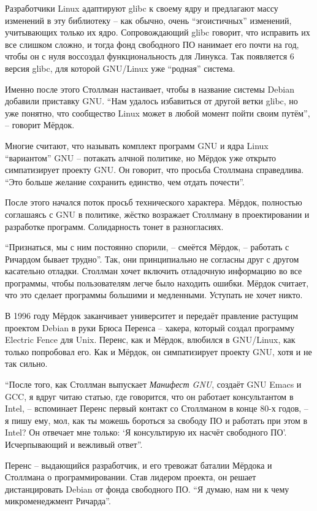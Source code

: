 Разработчики Linux адаптируют glibc к своему ядру и предлагают массу изменений в эту библиотеку -- как обычно, очень \enquote{эгоистичных} изменений, учитывающих только их ядро. Сопровождающий glibc говорит, что исправить их все слишком сложно, и тогда фонд свободного ПО нанимает его почти на год, чтобы он с нуля воссоздал функциональность для Линукса. Так появляется 6 версия glibc, для которой GNU/Linux уже \enquote{родная} система.

Именно после этого Столлман настаивает, чтобы в название системы Debian добавили приставку GNU. \enquote{Нам удалось избавиться от другой ветки glibc, но уже понятно, что сообщество Linux может в любой момент пойти своим путём}, -- говорит Мёрдок.

Многие считают, что называть комплект программ GNU и ядра Linux \enquote{вариантом} GNU -- потакать алчной политике, но Мёрдок уже открыто симпатизирует проекту GNU. Он говорит, что просьба Столлмана справедлива. \enquote{Это больше желание сохранить единство, чем отдать почести}.

После этого начался поток просьб технического характера. Мёрдок, полностью соглашаясь с GNU в политике, жёстко возражает Столлману в проектировании и разработке программ. Солидарность тонет в разногласиях.

\enquote{Признаться, мы с ним постоянно спорили, -- смеётся Мёрдок, -- работать с Ричардом бывает трудно}. Так, они принципиально не согласны друг с другом касательно отладки. Столлман хочет включить отладочную информацию во все программы, чтобы пользователям легче было находить ошибки. Мёрдок считает, что это сделает программы большими и медленными. Уступать не хочет никто.

В 1996 году Мёрдок заканчивает университет и передаёт правление растущим проектом Debian в руки Брюса Перенса -- хакера, который создал программу Electric Fence для Unix. Перенс, как и Мёрдок, влюбился в GNU/Linux, как только попробовал его. Как и Мёрдок, он симпатизирует проекту GNU, хотя и не так сильно.

\enquote{После того, как Столлман выпускает \textit{Манифест GNU}, создаёт GNU Emacs и GCC, я вдруг читаю статью, где говорится, что он работает консультантом в Intel, -- вспоминает Перенс первый контакт со Столлманом в конце 80-х годов, -- я пишу ему, мол, как ты можешь бороться за свободу ПО и работать при этом в Intel? Он отвечает мне только: \enquote{Я консультирую их насчёт свободного ПО}. Исчерпывающий и вежливый ответ}.

Перенс -- выдающийся разработчик, и его тревожат баталии Мёрдока и Столлмана о программировании. Став лидером проекта, он решает дистанцировать Debian от фонда свободного ПО. \enquote{Я думаю, нам ни к чему микроменеджмент Ричарда}.


